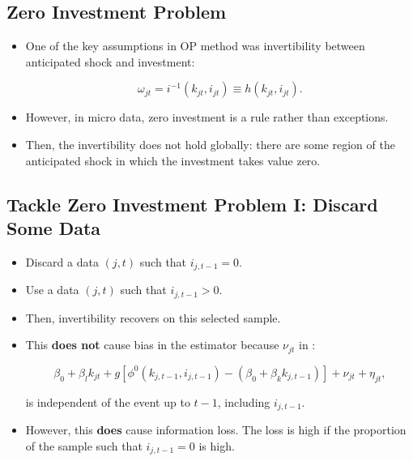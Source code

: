 \documentclass[]{book}
\providecommand{\tightlist}{%
  \setlength{\itemsep}{0pt}\setlength{\parskip}{0pt}}
\begin{document}
\subsection{Zero Investment Problem}\label{zero-investment-problem}

\begin{itemize}
\tightlist
\item
  One of the key assumptions in OP method was invertibility between
  anticipated shock and investment:

  \begin{equation}
  \omega_{jt} = i^{-1}(k_{jt}, i_{jt}) \equiv h(k_{jt}, i_{jt}).
  \end{equation}
\item
  However, in micro data, zero investment is a rule rather than
  exceptions.
\item
  Then, the invertibility does not hold globally: there are some region
  of the anticipated shock in which the investment takes value zero.
\end{itemize}

\subsection{Tackle Zero Investment Problem I: Discard Some
Data}\label{tackle-zero-investment-problem-i-discard-some-data}

\begin{itemize}
\tightlist
\item
  Discard a data \((j, t)\) such that \(i_{j, t - 1} = 0\).
\item
  Use a data \((j, t)\) such that \(i_{j, t - 1} > 0\).
\item
  Then, invertibility recovers on this selected sample.
\item
  This \textbf{does not} cause bias in the estimator because
  \(\nu_{jt}\) in :

  \begin{equation}
  \beta_0 + \beta_l k_{jt} + g[\phi^0(k_{j, t - 1}, i_{j, t - 1}) - (\beta_0 + \beta_k k_{j, t - 1})] + \nu_{jt} + \eta_{jt},
  \end{equation}

  is independent of the event up to \(t - 1\), including
  \(i_{j, t - 1}\).
\item
  However, this \textbf{does} cause information loss. The loss is high
  if the proportion of the sample such that \(i_{j, t - 1} = 0\) is
  high.
\end{itemize}
\end{document}
